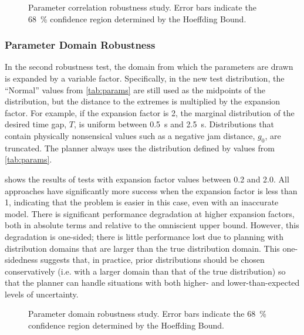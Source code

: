 \begin{figure}[htpb]
    \centering
    
    \caption[Parameter correlation robustness study]{Parameter correlation robustness study. Error bars indicate the \SI{68}{\percent} confidence region determined by the Hoeffding Bound.}
    \label{fig:corrob}
\end{figure}

\subsubsection{Parameter Domain Robustness}

In the second robustness test, the domain from which the parameters are drawn is expanded by a variable factor.
Specifically, in the new test distribution, the ``Normal'' values from \cref{tab:params} are still used as the midpoints of the distribution, but the distance to the extremes is multiplied by the expansion factor. 
For example, if the expansion factor is \num{2}, the marginal distribution of the desired time gap, $T$, is uniform between \SI{0.5}{\second} and \SI{2.5}{\second}.
Distributions that contain physically nonsensical values such as a negative jam distance, $g_0$, are truncated. 
The planner always uses the distribution defined by values from \cref{tab:params}.

 shows the results of tests with expansion factor values between \num{0.2} and \num{2.0}.
All approaches have significantly more success when the expansion factor is less than \num{1}, indicating that the problem is easier in this case, even with an inaccurate model.
There is significant performance degradation at higher expansion factors, both in absolute terms and relative to the omniscient upper bound.
However, this degradation is one-sided; there is little performance lost due to planning with distribution domains that are larger than the true distribution domain.
This one-sidedness suggests that, in practice, prior distributions should be chosen conservatively (i.e. with a larger domain than that of the true distribution) so that the planner can handle situations with both higher- and lower-than-expected levels of uncertainty. 

\begin{figure}[htpb]
    \centering
    
    \caption[Parameter domain robustness study]{Parameter domain robustness study. Error bars indicate the \SI{68}{\percent} confidence region determined by the Hoeffding Bound.}
    \label{fig:domrob}
\end{figure}

